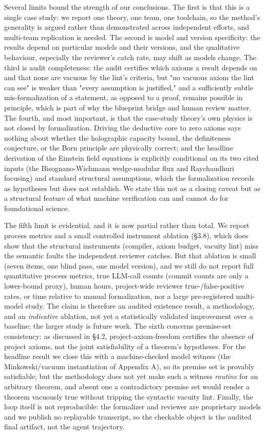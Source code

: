\documentclass[11pt]{article}
\begin{document}
Several limits bound the strength of our conclusions. The first is that this is a single case study:
we report one theory, one team, one toolchain, so the method's generality is argued rather than
demonstrated across independent efforts, and multi-team replication is needed. The second is model
and version specificity: the results depend on particular models and their versions, and the
qualitative behaviour, especially the reviewer's catch rate, may shift as models change. The third
is audit completeness: the audit certifies which axioms a result depends on and that none are
vacuous by the lint's criteria, but "no vacuous axiom the lint can see" is weaker than "every
assumption is justified," and a sufficiently subtle mis-formalization of a statement, as opposed to
a proof, remains possible in principle, which is part of why the blueprint bridge and human review
matter. The fourth, and most important, is that the case-study theory's own physics is not closed by
formalization. Driving the deductive core to zero axioms says nothing about whether the holographic
capacity bound, the definiteness conjecture, or the Born principle are physically correct; and the
headline derivation of the Einstein field equations is explicitly conditional on its two cited inputs
(the Bisognano-Wichmann wedge-modular flux and Raychaudhuri focusing) and standard structural
assumptions, which the formalization records as hypotheses but does not establish. We state this not
as a closing caveat but as a structural feature of what machine verification can and cannot do for
foundational science.

The fifth limit is evidential, and it is now partial rather than total. We report process metrics and
a small controlled instrument ablation (§3.8), which does show that the structural instruments
(compiler, axiom budget, vacuity lint) miss the semantic faults the independent reviewer catches. But
that ablation is small (seven items, one blind pass, one model version), and we still do not report
full quantitative process metrics, true LLM-call counts (commit counts are only a lower-bound proxy),
human hours, project-wide reviewer true-/false-positive rates, or time relative to manual
formalization, nor a large pre-registered multi-model study. The claim is therefore an audited
existence result, a methodology, and an \emph{indicative} ablation, not yet a statistically validated
improvement over a baseline; the larger study is future work. The sixth concerns premise-set consistency: as discussed in §4.2,
project-axiom-freedom certifies the absence of project axioms, not the joint satisfiability of a
theorem's hypotheses. For the headline result we close this with a machine-checked
model witness (the Minkowski/vacuum instantiation of Appendix A), so its premise set is provably
satisfiable; but the methodology does not yet make such a witness \emph{routine} for an arbitrary theorem,
and absent one a contradictory premise set would render a theorem vacuously true without tripping the
syntactic vacuity lint. Finally, the loop
itself is not reproducible: the formalizer and reviewer are proprietary models and we publish no
replayable transcript, so the checkable object is the audited final artifact, not the agent
trajectory.
\end{document}
